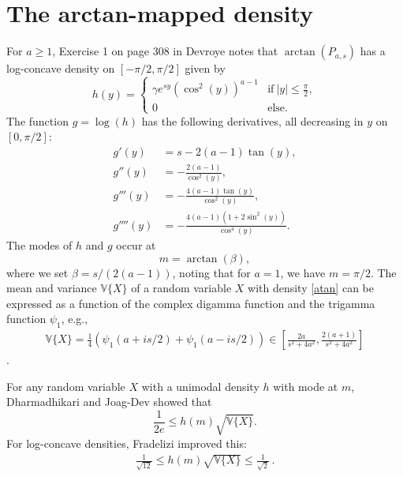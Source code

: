 \documentclass[12pt,reqno,tbtags]{amsart}
\newcommand{\Var}{\mathbb{V}}
\begin{document}
\section{The arctan-mapped density}\label{arctan}

For $a \ge 1$, Exercise 1 on page 308 in Devroye \cite{D5} notes that $\arctan (P_{a,s})$ has a log-concave density
on $[-\pi/2, \pi/2]$ given by
\begin{equation}\label{atan}
h(y) =  
\begin{cases}
\gamma e^{sy} ( \cos^2 (y) )^{a-1} & \text{if} ~|y| \le \frac{\pi }{ 2}, \\
0 & \text{else.} 
\end{cases}
\end{equation}
The function $g = \log (h)$ has the following derivatives, all decreasing in $y$ on $[0,\pi/2]$:
\begin{align}\label{derivatives}
g' (y) &= s - 2(a-1) \tan (y) ,\\
g'' (y) &= - \frac{2 (a-1)} {\cos^2 (y)}, \\
g''' (y) &= - \frac{4 (a-1) \tan (y)} {\cos^2 (y)} ,\\
g'''' (y) &= - \frac{4 (a-1) ( 1 + 2 \sin^2 (y)) } {\cos^4 (y)}.
\end{align}
The modes of $h$ and $g$ occur at
$$
m = \arctan (\beta),
$$
where we set $\beta = s/(2(a-1))$, noting that for $a=1$, we have $m = \pi/2$.
The mean and variance $\Var \{ X \}$ of a random variable $X$
with density \eqref{atan} can be expressed as a function of the complex
digamma function and the trigamma function $\psi_1$, e.g.,
\begin{align}\label{variance}
\Var \{ X \} 
= \frac{1}{4} \left( \psi_1 (a+ is/2) + \psi_1 (a- is/2) \right)
\in \left[ \frac{2a}{s^2 + 4a^2} , \frac{2(a+1)}{s^2 + 4a^2}\right]
\end{align}
\cite{Barndorff1982}. 

For any random variable $X$ with a unimodal density $h$ with mode at $m$, Dharma\-dhikari and Joag-Dev \cite{Dharmadhikari1982}\cite{Dharmadhikari1988}\cite{Abu-Bakut2011} showed that
$$
\frac{1}{2e } \le h(m)\sqrt{\Var\{X\}}.
$$
For log-concave densities, Fradelizi \cite{Fradelizi1997} improved this:
\begin{align}\label{fradelizi}
\frac{1}{\sqrt{12} } \le h(m)\sqrt{\Var\{X\}} \le \frac{1}{\sqrt{2}}\,.
\end{align}
\end{document}
